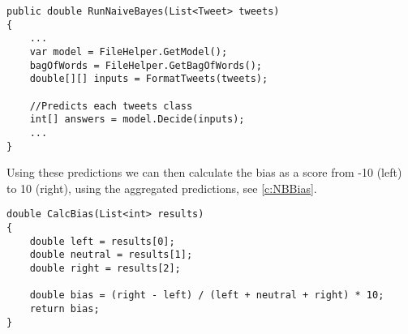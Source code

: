 \begin{minipage}[H]{\linewidth}
\begin{lstlisting}[caption = Load the Naive Bayes model and find
bias, label = c:Run] 
public double RunNaiveBayes(List<Tweet> tweets)
{
    ...
    var model = FileHelper.GetModel();
    bagOfWords = FileHelper.GetBagOfWords();
    double[][] inputs = FormatTweets(tweets);

    //Predicts each tweets class
    int[] answers = model.Decide(inputs);
    ...
}
\end{lstlisting}
\end{minipage}

Using these predictions we can then calculate the bias as a score from -10
(left) to 10 (right), using the aggregated predictions, see \autoref{c:NBBias}. 

\begin{minipage}[H]{\linewidth}
\begin{lstlisting}[caption = Determines the users bias based on the predictions,
label = c:NBBias]
double CalcBias(List<int> results)
{
    double left = results[0];
    double neutral = results[1];
    double right = results[2];

    double bias = (right - left) / (left + neutral + right) * 10;
    return bias;
}
\end{lstlisting}
\end{minipage}